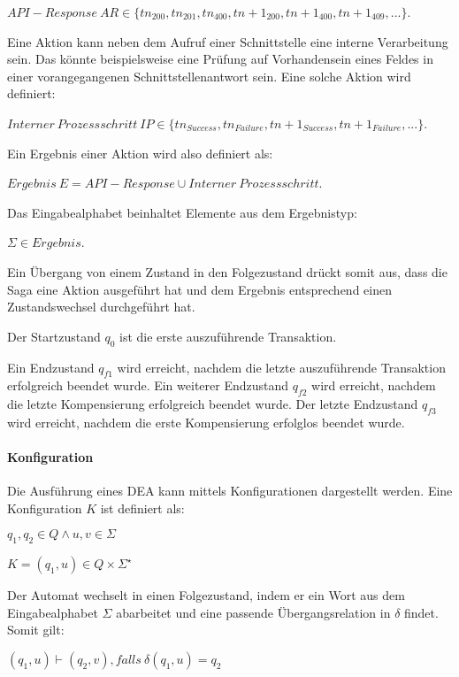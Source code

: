 $API-Response\ AR \in \{tn_{200}, tn_{201}, tn_{400}, tn+1_{200}, tn+1_{400}, tn+1_{409}, ...\}$. 

Eine Aktion kann neben dem Aufruf einer Schnittstelle eine interne Verarbeitung sein. Das könnte beispielsweise eine Prüfung auf Vorhandensein eines Feldes in einer vorangegangenen Schnittstellenantwort sein. Eine solche Aktion wird definiert:

$Interner\ Prozessschritt\ IP \in \{tn_{Success}, tn_{Failure}, tn+1_{Success}, tn+1_{Failure}, ...\}$.
 
Ein Ergebnis einer Aktion wird also definiert als:

$Ergebnis\ E = API-Response \cup Interner\ Prozessschritt$.

Das Eingabealphabet beinhaltet Elemente aus dem Ergebnistyp: 

$\Sigma \in Ergebnis$.

Ein Übergang von einem Zustand in den Folgezustand drückt somit aus, dass die Saga eine Aktion ausgeführt hat und dem Ergebnis entsprechend einen Zustandswechsel durchgeführt hat. 

Der Startzustand $q_0$ ist die erste auszuführende Transaktion. 

Ein Endzustand $q_{f1}$ wird erreicht, nachdem die letzte auszuführende Transaktion erfolgreich beendet wurde. Ein weiterer Endzustand $q_{f2}$ wird erreicht, nachdem die letzte Kompensierung erfolgreich beendet wurde. Der letzte Endzustand $q_{f3}$ wird erreicht, nachdem die erste Kompensierung erfolglos beendet wurde.

\paragraph{Konfiguration}%
Die Ausführung eines DEA kann mittels Konfigurationen dargestellt werden. Eine Konfiguration $K$ ist definiert als: 

$q_{1}, q_{2} \in Q \land u,v \in \Sigma$

$K = (q_{1}, u) \in Q \times \Sigma^{\star}$

Der Automat wechselt in einen Folgezustand, indem er ein Wort aus dem Eingabealphabet $\Sigma$ abarbeitet und eine passende Übergangsrelation in $\delta$ findet. Somit gilt:

$(q_{1}, u)\vdash (q_{2}, v), falls\ \delta(q_{1}, u) = q_{2}$

